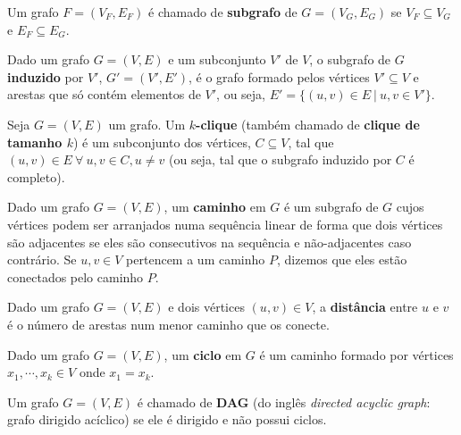 \begin{definition}[subgrafo]
  Um grafo $F = (V_F, E_F)$ é chamado de \textbf{subgrafo} de $G = (V_G, E_G)$ se $V_F \subseteq V_G$ e $E_F \subseteq E_G$.
\end{definition}

\begin{definition}
  Dado um grafo $G = (V, E)$ e um subconjunto $V'$ de $V$, o subgrafo de $G$ \textbf{induzido} por $V'$, $G' = (V', E')$, é o grafo formado pelos vértices $V' \subseteq V$ e arestas que só contém elementos de $V'$, ou seja, $E' = \{(u, v) \in E \ | \  u, v \in V'\}$.
\end{definition}

\begin{definition}[$k$-clique]
  Seja $G = (V, E)$ um grafo. Um \textbf{$k$-clique} (também chamado de \textbf{clique de tamanho $k$}) é um subconjunto dos vértices, $C \subseteq V$, tal que $(u, v) \in E \ \forall \ u, v \in C, u \neq v$ (ou seja, tal que o subgrafo induzido por $C$ é completo).
\end{definition}

\begin{definition}[caminho]
  Dado um grafo $G = (V, E)$, um \textbf{caminho} em $G$ é um subgrafo de $G$ cujos vértices podem ser arranjados numa sequência linear de forma que dois vértices são adjacentes se eles são consecutivos na sequência e não-adjacentes caso contrário. Se $u, v \in V$ pertencem a um caminho $P$, dizemos que eles estão conectados pelo caminho $P$.
\end{definition}

\begin{definition}[distância]
  Dado um grafo $G = (V, E)$ e dois vértices $(u, v) \in V$, a \textbf{distância} entre $u$ e $v$ é o número de arestas num menor caminho que os conecte.
\end{definition}

\begin{definition}[ciclo]
  Dado um grafo $G = (V, E)$, um \textbf{ciclo} em $G$ é um caminho formado por vértices $x_1, \cdots, x_k \in V$ onde $x_1 = x_k$.
\end{definition}

\begin{definition}[DAG]
  Um grafo $G = (V, E)$ é chamado de \textbf{DAG} (do inglês \emph{directed acyclic graph}: grafo dirigido acíclico) se ele é dirigido e não possui ciclos.
\end{definition}

